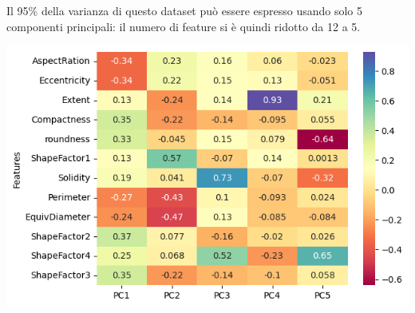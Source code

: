 Il 95\% della varianza di questo dataset può essere espresso usando solo
5 componenti principali: il numero di feature si è quindi ridotto da 12 a 5.

\begin{Figure}
    \centering
    \includegraphics[width=\linewidth]{img/pca_features_weights.png}
\end{Figure}

